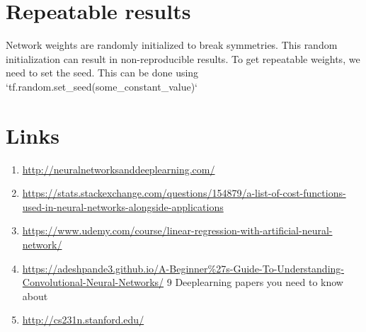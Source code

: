 \documentclass{article}
\begin{document}
\section{Repeatable results}
Network weights are randomly initialized to break symmetries. This random initialization can result in non-reproducible results. To get repeatable weights, we need to set the seed. This can be done using `tf.random.set\_seed(some\_constant\_value)`
\section{Links}
\begin{enumerate}
\item{\url{http://neuralnetworksanddeeplearning.com/}}
\item{\url{https://stats.stackexchange.com/questions/154879/a-list-of-cost-functions-used-in-neural-networks-alongside-applications}}
\item{\url{https://www.udemy.com/course/linear-regression-with-artificial-neural-network/}}
\item{\url{https://adeshpande3.github.io/A-Beginner%27s-Guide-To-Understanding-Convolutional-Neural-Networks/} 9 Deeplearning  papers you need to know about}
\item{\url{http://cs231n.stanford.edu/}}    
\end{enumerate}
\end{document}
